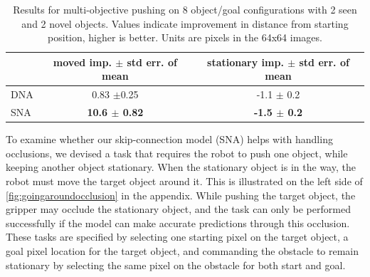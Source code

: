 


\begin{table}
\centering
{\footnotesize
\begin{tabular}{lcc}
	\toprule
         &  \thead{moved imp. \\ $\pm$ std err. of mean} &   \thead{stationary imp. \\ $\pm$ std err. of mean}  \\
         \midrule
  DNA \cite{foresight} & 0.83 $\pm$0.25 &  -1.1 $\pm$ 0.2\\ 
  SNA & \textbf{10.6 $\pm$ 0.82} & \textbf{-1.5 $\pm$ 0.2} \\
  \bottomrule
\end{tabular}
}
\caption{Results for multi-objective pushing on 8 object/goal configurations with 2 seen and 2 novel objects. Values indicate improvement in distance from starting position, higher is better. Units are pixels in the 64x64 images.} 
\label{table:mult_obj}
\end{table}

To examine whether our skip-connection model (SNA) helps with handling occlusions, we devised a task that requires the robot to push one object, while keeping another object stationary. When the stationary object is in the way, the robot must move the target object around it. This is illustrated on the left side of \autoref{fig:goingaroundocclusion} in the appendix. While pushing the target object, the gripper may occlude the stationary object, and the task can only be performed successfully if the model can make accurate predictions through this occlusion. These tasks are specified by selecting one starting pixel on the target object, a goal pixel location for the target object, and commanding the obstacle to remain stationary by selecting the same pixel on the obstacle for both start and goal. 

